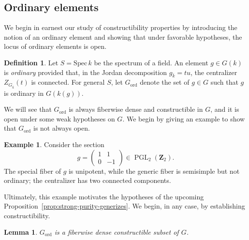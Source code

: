 \documentclass[11pt,reqno]{amsart}
\newtheorem{lemma}[theorem]{Lemma}
\theoremstyle{definition}
\newtheorem{definition}[theorem]{Definition}
\newtheorem{example}[theorem]{Example}
\renewcommand{\rm}{\mathrm}
\newcommand{\Spec}{\mathrm{Spec} \,}
\newcommand{\bZ}{{\mathbf Z}}
\DeclareMathOperator{\PGL}{PGL}
\begin{document}
\subsection{Ordinary elements}

We begin in earnest our study of constructibility properties by introducing the notion of an ordinary element and showing that under favorable hypotheses, the locus of ordinary elements is open.

\begin{definition}\label{definition:ordinary}
Let $S = \Spec k$ be the spectrum of a field. An element $g \in G(k)$ is \textit{ordinary} provided that, in the Jordan decomposition $g_{\overline{k}} = tu$, the centralizer $Z_{G_{\overline{k}}}(t)$ is connected. For general $S$, let $G_{\rm{ord}}$ denote the set of $g \in G$ such that $g$ is ordinary in $G(k(g))$.
\end{definition}

We will see that $G_{\rm{ord}}$ is always fiberwise dense and constructible in $G$, and it is open under some weak hypotheses on $G$. We begin by giving an example to show that $G_{\rm{ord}}$ is not always open.

\begin{example}
Consider the section
\[
g = \begin{pmatrix} 1 & 1 \\ 0 & -1 \end{pmatrix} \in \PGL_2(\bZ_2).
\]
The special fiber of $g$ is unipotent, while the generic fiber is semisimple but not ordinary; the centralizer has two connected components.
\end{example}

Ultimately, this example motivates the hypotheses of the upcoming Proposition~\ref{prop:strong-purity-generizes}. We begin, in any case, by establishing constructibility.

\begin{lemma}\label{lemma:ordinary-locus-is-locally-constructible}
$G_{\rm{ord}}$ is a fiberwise dense constructible subset of $G$.
\end{lemma}
\end{document}
